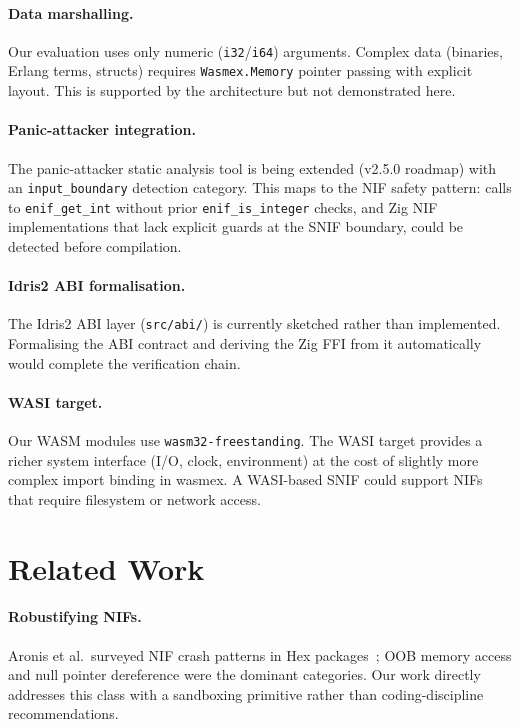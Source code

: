 \documentclass[11pt,a4paper]{article}
\begin{document}
\paragraph{Data marshalling.}
Our evaluation uses only numeric (\texttt{i32}/\texttt{i64}) arguments.
Complex data (binaries, Erlang terms, structs) requires \texttt{Wasmex.Memory}
pointer passing with explicit layout. This is supported by the architecture
but not demonstrated here.

\paragraph{Panic-attacker integration.}
The panic-attacker static analysis tool is being extended (v2.5.0 roadmap) with
an \texttt{input\_boundary} detection category. This maps to the NIF safety
pattern: calls to \texttt{enif\_get\_int} without prior \texttt{enif\_is\_integer}
checks, and Zig NIF implementations that lack explicit guards at the SNIF
boundary, could be detected before compilation.

\paragraph{Idris2 ABI formalisation.}
The Idris2 ABI layer (\texttt{src/abi/}) is currently sketched rather than
implemented. Formalising the ABI contract and deriving the Zig FFI from it
automatically would complete the verification chain.

\paragraph{WASI target.}
Our WASM modules use \texttt{wasm32-freestanding}. The WASI target provides a
richer system interface (I/O, clock, environment) at the cost of slightly more
complex import binding in wasmex. A WASI-based SNIF could support NIFs that
require filesystem or network access.

\section{Related Work}

\paragraph{Robustifying NIFs.}
Aronis et al.\ surveyed NIF crash patterns in Hex packages~\cite{nif-safety-2018}; OOB
memory access and null pointer dereference were the dominant categories.
Our work directly addresses this class with a sandboxing primitive rather than
coding-discipline recommendations.
\end{document}
